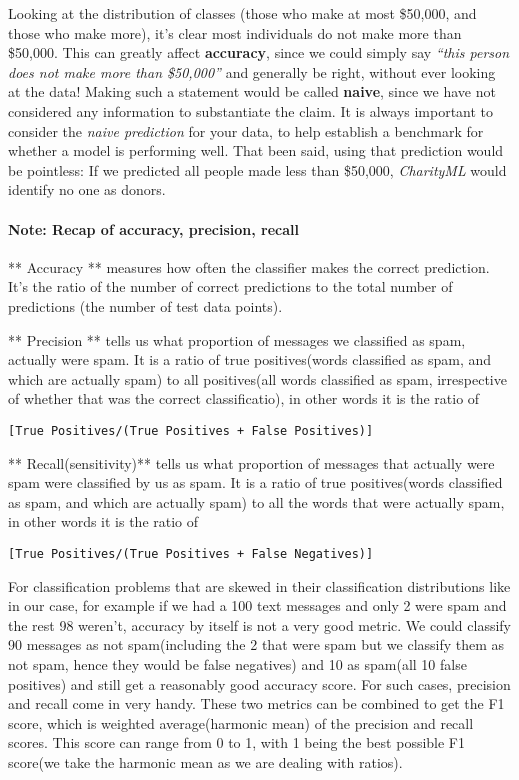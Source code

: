 \documentclass[11pt]{article}
\begin{document}
Looking at the distribution of classes (those who make at most \$50,000,
and those who make more), it's clear most individuals do not make more
than \$50,000. This can greatly affect \textbf{accuracy}, since we could
simply say \emph{``this person does not make more than \$50,000''} and
generally be right, without ever looking at the data! Making such a
statement would be called \textbf{naive}, since we have not considered
any information to substantiate the claim. It is always important to
consider the \emph{naive prediction} for your data, to help establish a
benchmark for whether a model is performing well. That been said, using
that prediction would be pointless: If we predicted all people made less
than \$50,000, \emph{CharityML} would identify no one as donors.

\hypertarget{note-recap-of-accuracy-precision-recall}{%
\paragraph{Note: Recap of accuracy, precision,
recall}\label{note-recap-of-accuracy-precision-recall}}

** Accuracy ** measures how often the classifier makes the correct
prediction. It's the ratio of the number of correct predictions to the
total number of predictions (the number of test data points).

** Precision ** tells us what proportion of messages we classified as
spam, actually were spam. It is a ratio of true positives(words
classified as spam, and which are actually spam) to all positives(all
words classified as spam, irrespective of whether that was the correct
classificatio), in other words it is the ratio of

\texttt{{[}True\ Positives/(True\ Positives\ +\ False\ Positives){]}}

** Recall(sensitivity)** tells us what proportion of messages that
actually were spam were classified by us as spam. It is a ratio of true
positives(words classified as spam, and which are actually spam) to all
the words that were actually spam, in other words it is the ratio of

\texttt{{[}True\ Positives/(True\ Positives\ +\ False\ Negatives){]}}

For classification problems that are skewed in their classification
distributions like in our case, for example if we had a 100 text
messages and only 2 were spam and the rest 98 weren't, accuracy by
itself is not a very good metric. We could classify 90 messages as not
spam(including the 2 that were spam but we classify them as not spam,
hence they would be false negatives) and 10 as spam(all 10 false
positives) and still get a reasonably good accuracy score. For such
cases, precision and recall come in very handy. These two metrics can be
combined to get the F1 score, which is weighted average(harmonic mean)
of the precision and recall scores. This score can range from 0 to 1,
with 1 being the best possible F1 score(we take the harmonic mean as we
are dealing with ratios).
\end{document}
